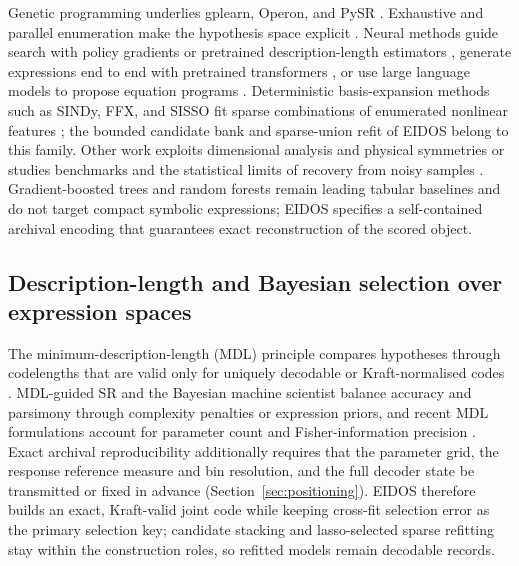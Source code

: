 Genetic programming \citep{koza1992} underlies gplearn, Operon, and PySR \citep{stephens2015gplearn,burlacu2020operon,cranmer2023pysr}. Exhaustive and parallel enumeration make the hypothesis space explicit \citep{bartlett2024exhaustive,ruan2026pse}. Neural methods guide search with policy gradients or pretrained description-length estimators \citep{petersen2020dsr,yu2025mdlformer}, generate expressions end to end with pretrained transformers \citep{kamienny2022e2e}, or use large language models to propose equation programs \citep{shojaee2025llmsr}. Deterministic basis-expansion methods such as SINDy, FFX, and SISSO fit sparse combinations of enumerated nonlinear features \citep{brunton2016,mcconaghy2011ffx,ouyang2018sisso}; the bounded candidate bank and sparse-union refit of EIDOS belong to this family. Other work exploits dimensional analysis and physical symmetries \citep{udrescu2020aifeynman,tenachi2023physo} or studies benchmarks and the statistical limits of recovery from noisy samples \citep{olson2017pmlb,lacava2021srbench,fajardofontiveros2023limits}. Gradient-boosted trees and random forests remain leading tabular baselines \citep{breiman2001rf,chen2016xgboost,ke2017lightgbm} and do not target compact symbolic expressions; EIDOS specifies a self-contained archival encoding that guarantees exact reconstruction of the scored object.

\subsection{Description-length and Bayesian selection over expression spaces}

The minimum-description-length (MDL) principle compares hypotheses through codelengths that are valid only for uniquely decodable or Kraft-normalised codes \citep{rissanen1978,grunwald2007mdl}. MDL-guided SR \citep{bartlett2024exhaustive,yu2025mdlformer} and the Bayesian machine scientist \citep{guimera2020bms} balance accuracy and parsimony through complexity penalties or expression priors, and recent MDL formulations account for parameter count and Fisher-information precision \citep{bartlett2024exhaustive}. Exact archival reproducibility additionally requires that the parameter grid, the response reference measure and bin resolution, and the full decoder state be transmitted or fixed in advance (Section~\ref{sec:positioning}). EIDOS therefore builds an exact, Kraft-valid joint code while keeping cross-fit selection error as the primary selection key; candidate stacking \citep{breiman1996stacked} and lasso-selected sparse refitting \citep{tibshirani1996lasso} stay within the construction roles, so refitted models remain decodable records.

